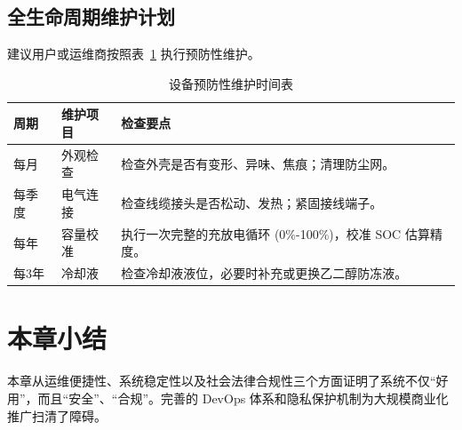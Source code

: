 \subsection{全生命周期维护计划}

建议用户或运维商按照表~\ref{tab:maintenance} 执行预防性维护。

\begin{table}[htbp]
    \centering
    \caption{设备预防性维护时间表}
    \label{tab:maintenance}
    \begin{tabularx}{\textwidth}{|l|l|X|}
        \hline
        \textbf{周期} & \textbf{维护项目} & \textbf{检查要点}                         \\ \hline
        每月          & 外观检查          & 检查外壳是否有变形、异味、焦痕；清理防尘网。                \\ \hline
        每季度         & 电气连接          & 检查线缆接头是否松动、发热；紧固接线端子。                 \\ \hline
        每年          & 容量校准          & 执行一次完整的充放电循环 (0\%-100\%)，校准 SOC 估算精度。 \\ \hline
        每3年         & 冷却液           & 检查冷却液液位，必要时补充或更换乙二醇防冻液。               \\ \hline
    \end{tabularx}
\end{table}

\section{本章小结}
本章从运维便捷性、系统稳定性以及社会法律合规性三个方面证明了系统不仅“好用”，而且“安全”、“合规”。完善的 DevOps 体系和隐私保护机制为大规模商业化推广扫清了障碍。
